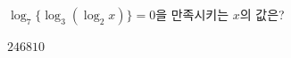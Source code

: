 $\log_7 \{\log_3 (\log_2 x)\}=0$을 만족시키는 $x$의 값은?
\begin{choices32}{$2$}{$4$}{$6$}{$8$}{$10$}\end{choices32}
